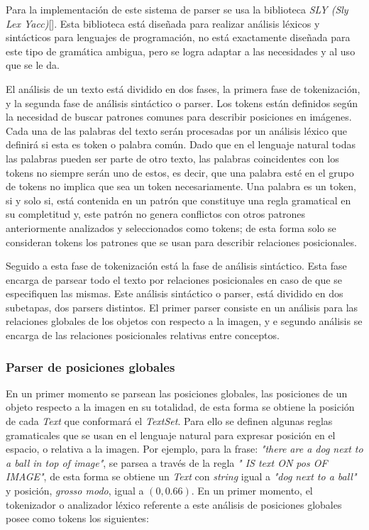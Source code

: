 Para la implementación de este sistema de parser se usa la biblioteca \textit{SLY (Sly Lex Yacc)}[\cite{sly}]. Esta biblioteca está diseñada para realizar análisis léxicos y sintácticos para lenguajes de programación, no está exactamente diseñada para este tipo de gramática ambigua, pero se logra adaptar a las necesidades y al uso que se le da.

El análisis de un texto está dividido en dos fases, la primera fase de tokenización, y la segunda fase de análisis sintáctico o parser. Los tokens están definidos según la necesidad de buscar patrones comunes para describir posiciones en imágenes. Cada una de las palabras del texto serán procesadas por un análisis léxico que definirá si esta es token o palabra común. Dado que en el lenguaje natural todas las palabras pueden ser parte de otro texto, las palabras coincidentes con los tokens no siempre serán uno de estos, es decir, que una palabra esté en el grupo de tokens no implica que sea un token necesariamente. Una palabra es un token, si y solo si, está contenida en un patrón que constituye una regla gramatical en su completitud y, este patr\'on no genera conflictos con otros patrones anteriormente analizados y seleccionados como tokens; de esta forma solo se consideran tokens los patrones que se usan para describir relaciones posicionales. 

Seguido a esta fase de tokenización est\'a la fase de análisis sintáctico. Esta fase encarga de parsear todo el texto por relaciones posicionales en caso de que se especifiquen las mismas. Este análisis sint\'actico o parser, está dividido en dos subetapas, dos parsers distintos. El primer parser consiste en un análisis para las relaciones globales de los objetos con respecto a la imagen, y e segundo análisis se encarga de las relaciones posicionales relativas entre conceptos.

\subsubsection{Parser de posiciones globales}

En un primer momento se parsean las posiciones globales, las posiciones de un objeto respecto a la imagen en su totalidad, de esta forma se obtiene la posición de cada \textit{Text} que conformará el \textit{TextSet}. Para ello se definen algunas reglas gramaticales que se usan en el lenguaje natural para expresar posición en el espacio, o relativa a la imagen. Por ejemplo, para la frase: \textit{"there are a dog next to a ball in top of image"}, se parsea a través de la regla \textit{" IS text ON pos OF IMAGE"}, de esta forma se obtiene un \textit{Text} con \textit{string} igual a \textit{"dog next to a ball"} y posici\'on, \textit{grosso modo}, igual a $(0, 0.66)$. En un primer momento, el tokenizador o analizador léxico referente a este análisis de posiciones globales posee como tokens los siguientes:

